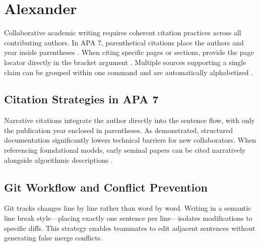 \section{Alexander}
Collaborative academic writing requires coherent citation practices across all contributing authors.
In APA 7, parenthetical citations place the authors and year inside parentheses \parencite{smith2023}.
When citing specific pages or sections, provide the page locator directly in the bracket argument \parencite[p.~46]{smith2023}.
Multiple sources supporting a single claim can be grouped within one command and are automatically alphabetized \parencite{eiben2015, smith2023}.

\subsection{Citation Strategies in APA 7}
Narrative citations integrate the author directly into the sentence flow, with only the publication year enclosed in parentheses.
As \textcite{miller2021} demonstrated, structured documentation significantly lowers technical barriers for new collaborators.
When referencing foundational models, early seminal papers can be cited narratively alongside algorithmic descriptions \parencite{kennedy1995}.

\subsection{Git Workflow and Conflict Prevention}
Git tracks changes line by line rather than word by word.
Writing in a semantic line break style—placing exactly one sentence per line—isolates modifications to specific diffs.
This strategy enables teammates to edit adjacent sentences without generating false merge conflicts.
